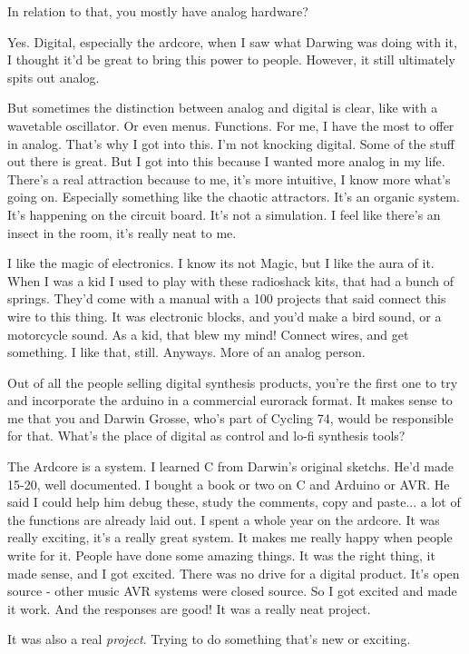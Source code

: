 In relation to that, you mostly have analog hardware?

Yes. Digital, especially the ardcore, when I saw what Darwing was doing with it, I thought it'd be great to bring this power to people. However, it still ultimately spits out analog. 

But sometimes the distinction between analog and digital is clear, like with a wavetable oscillator. Or even menus. Functions. For me, I have the most to offer in analog. That's why I got into this. I'm not knocking digital. Some of the stuff out there is great. But I got into this because I wanted more analog in my life. There's a real attraction because to me, it's more intuitive, I know more what's going on. Especially something like the chaotic attractors. It's an organic system. It's happening on the circuit board. It's not a simulation. I feel like there's an insect in the room, it's really neat to me. 

I like the magic of electronics. I know its not Magic, but I like the aura of it. When I was a kid I used to play with these radioshack kits, that had a bunch of springs. They'd come with a manual with a 100 projects that said connect this wire to this thing. It was electronic blocks, and you'd make a bird sound, or a motorcycle sound. As a kid, that blew my mind! Connect wires, and get something. I like that, still. Anyways. More of an analog person. 

Out of all the people selling digital synthesis products, you're the first one to try and incorporate the arduino in a commercial eurorack format. It makes sense to me that you and Darwin Grosse, who's part of Cycling 74, would be responsible for that. What's the place of digital as control and lo-fi synthesis tools? 

The Ardcore is a system. I learned C from Darwin's original sketchs. He'd made 15-20, well documented. I bought a book or two on C and Arduino or AVR. He said I could help him debug these, study the comments, copy and paste... a lot of the functions are already laid out. I spent a whole year on the ardcore. It was really exciting, it's a really great system. It makes me really happy when people write for it. People have done some amazing things. It was the right thing, it made sense, and I got excited. There was no drive for a digital product. It's open source - other music AVR systems were closed source. So I got excited and made it work. And the responses are good! It was a really neat project. 

It was also a real \emph{project}. Trying to do something that's new or exciting. 

